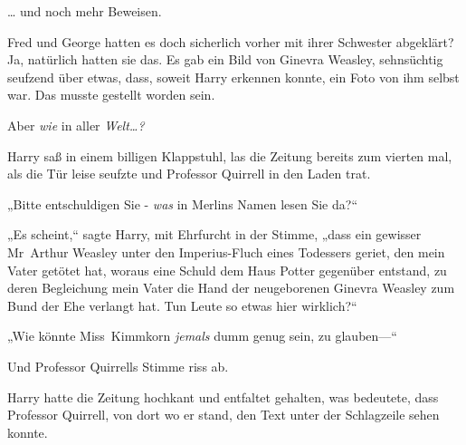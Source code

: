 … und noch mehr Beweisen.

Fred und George hatten es doch sicherlich vorher mit ihrer Schwester abgeklärt? Ja, natürlich hatten sie das. Es gab ein Bild von Ginevra Weasley, sehnsüchtig seufzend über etwas, dass, soweit Harry erkennen konnte, ein Foto von ihm selbst war. Das musste gestellt worden sein.

Aber \emph{wie} in aller \emph{Welt…?}

Harry saß in einem billigen Klappstuhl, las die Zeitung bereits zum vierten mal, als die Tür leise seufzte und Professor Quirrell in den Laden trat.

„Bitte entschuldigen Sie - \emph{was} in Merlins Namen lesen Sie da?“

„Es scheint,“ sagte Harry, mit Ehrfurcht in der Stimme, „dass ein gewisser Mr~Arthur Weasley unter den Imperius-Fluch eines Todessers geriet, den mein Vater getötet hat, woraus eine Schuld dem Haus Potter gegenüber entstand, zu deren Begleichung mein Vater die Hand der neugeborenen Ginevra Weasley zum Bund der Ehe verlangt hat. Tun Leute so etwas hier wirklich?“

„Wie könnte Miss~Kimmkorn \emph{jemals} dumm genug sein, zu glauben—“

Und Professor Quirrells Stimme riss ab.

Harry hatte die Zeitung hochkant und entfaltet gehalten, was bedeutete, dass Professor Quirrell, von dort wo er stand, den Text unter der Schlagzeile sehen konnte.

